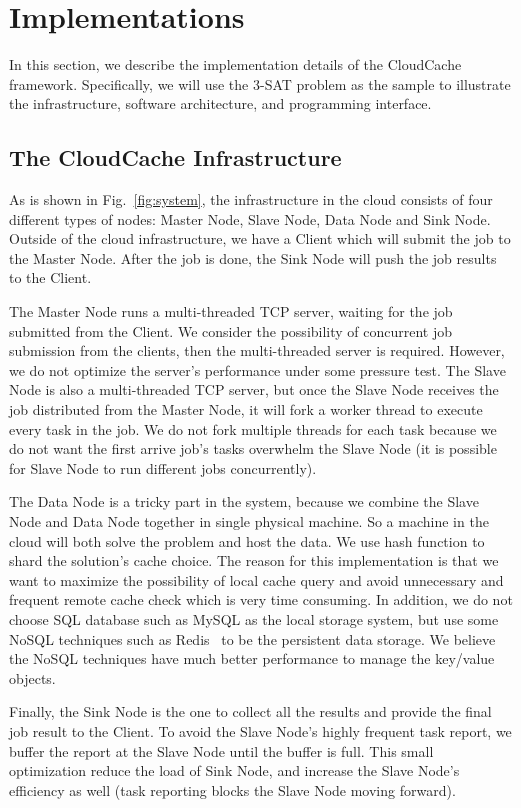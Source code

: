 \section{Implementations}\label{sec:implementation}
In this section, we describe the implementation details of the CloudCache framework. Specifically, we will use the 3-SAT problem as the sample to illustrate the infrastructure, software architecture, and programming interface.

\subsection{The CloudCache Infrastructure}
As is shown in Fig.~\ref{fig:system}, the infrastructure in the cloud consists of four different types of nodes: Master Node, Slave Node, Data Node and Sink Node. Outside of the cloud infrastructure, we have a Client which will submit the job to the Master Node. After the job is done, the Sink Node will push the job results to the Client.

The Master Node runs a multi-threaded TCP server, waiting for the job submitted from the Client. We consider the possibility of concurrent job submission from the clients, then the multi-threaded server is required. However, we do not optimize the server's performance under some pressure test. The Slave Node is also a multi-threaded TCP server, but once the Slave Node receives the job distributed from the Master Node, it will fork a worker thread to execute every task in the job. We do not fork multiple threads for each task because we do not want the first arrive job's tasks overwhelm the Slave Node (it is possible for Slave Node to run different jobs concurrently).

The Data Node is a tricky part in the system, because we combine the Slave Node and Data Node together in single physical machine. So a machine in the cloud will both solve the problem and host the data. We use hash function to shard the solution's cache choice. The reason for this implementation is that we want to maximize the possibility of local cache query and avoid unnecessary and frequent remote cache check which is very time consuming. In addition, we do not choose SQL database such as MySQL as the local storage system, but use some NoSQL techniques such as Redis~\cite{macedo2011redis} to be the persistent data storage. We believe the NoSQL techniques have much better performance to manage the key/value objects.

Finally, the Sink Node is the one to collect all the results and provide the final job result to the Client. To avoid the Slave Node's highly frequent task report, we buffer the report at the Slave Node until the buffer is full. This small optimization reduce the load of Sink Node, and increase the Slave Node's efficiency as well (task reporting blocks the Slave Node moving forward).

